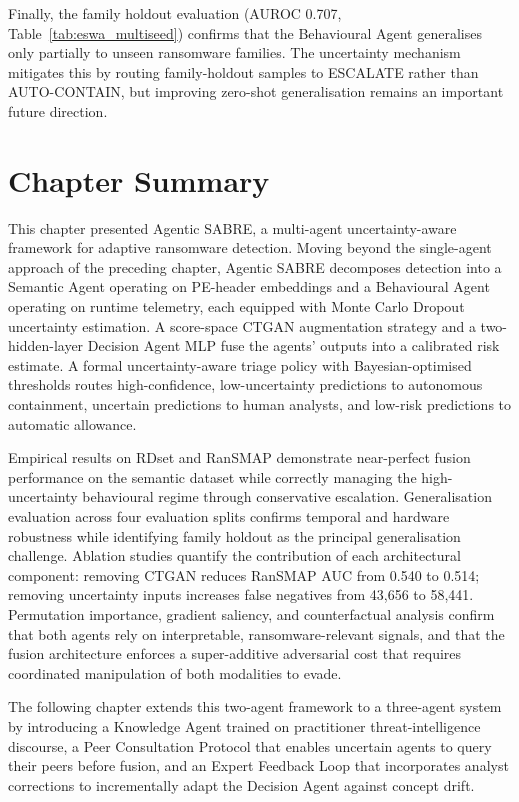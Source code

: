 Finally, the family holdout evaluation (AUROC 0.707, Table~\ref{tab:eswa_multiseed}) confirms that the Behavioural Agent generalises only partially to unseen ransomware families. The uncertainty mechanism mitigates this by routing family-holdout samples to \textsc{ESCALATE} rather than \textsc{AUTO-CONTAIN}, but improving zero-shot generalisation remains an important future direction.


\section{Chapter Summary}
\label{sec:eswa_summary}

This chapter presented Agentic SABRE, a multi-agent uncertainty-aware framework for adaptive ransomware detection. Moving beyond the single-agent approach of the preceding chapter, Agentic SABRE decomposes detection into a Semantic Agent operating on PE-header embeddings and a Behavioural Agent operating on runtime telemetry, each equipped with Monte Carlo Dropout uncertainty estimation. A score-space CTGAN augmentation strategy and a two-hidden-layer Decision Agent MLP fuse the agents' outputs into a calibrated risk estimate. A formal uncertainty-aware triage policy with Bayesian-optimised thresholds routes high-confidence, low-uncertainty predictions to autonomous containment, uncertain predictions to human analysts, and low-risk predictions to automatic allowance.

Empirical results on RDset and RanSMAP demonstrate near-perfect fusion performance on the semantic dataset while correctly managing the high-uncertainty behavioural regime through conservative escalation. Generalisation evaluation across four evaluation splits confirms temporal and hardware robustness while identifying family holdout as the principal generalisation challenge. Ablation studies quantify the contribution of each architectural component: removing CTGAN reduces RanSMAP AUC from 0.540 to 0.514; removing uncertainty inputs increases false negatives from 43,656 to 58,441. Permutation importance, gradient saliency, and counterfactual analysis confirm that both agents rely on interpretable, ransomware-relevant signals, and that the fusion architecture enforces a super-additive adversarial cost that requires coordinated manipulation of both modalities to evade.

The following chapter extends this two-agent framework to a three-agent system by introducing a Knowledge Agent trained on practitioner threat-intelligence discourse, a Peer Consultation Protocol that enables uncertain agents to query their peers before fusion, and an Expert Feedback Loop that incorporates analyst corrections to incrementally adapt the Decision Agent against concept drift.

